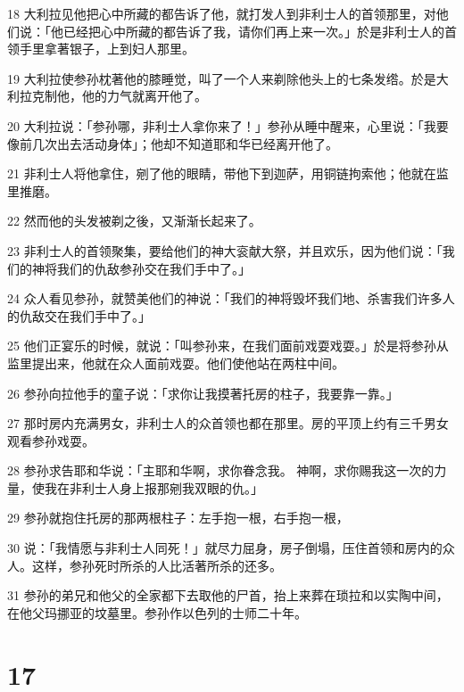 \par 18 大利拉见他把心中所藏的都告诉了他，就打发人到非利士人的首领那里，对他们说：「他已经把心中所藏的都告诉了我，请你们再上来一次。」於是非利士人的首领手里拿著银子，上到妇人那里。
\par 19 大利拉使参孙枕著他的膝睡觉，叫了一个人来剃除他头上的七条发绺。於是大利拉克制他，他的力气就离开他了。
\par 20 大利拉说：「参孙哪，非利士人拿你来了！」参孙从睡中醒来，心里说：「我要像前几次出去活动身体」；他却不知道耶和华已经离开他了。
\par 21 非利士人将他拿住，剜了他的眼睛，带他下到迦萨，用铜链拘索他；他就在监里推磨。
\par 22 然而他的头发被剃之後，又渐渐长起来了。
\par 23 非利士人的首领聚集，要给他们的神大衮献大祭，并且欢乐，因为他们说：「我们的神将我们的仇敌参孙交在我们手中了。」
\par 24 众人看见参孙，就赞美他们的神说：「我们的神将毁坏我们地、杀害我们许多人的仇敌交在我们手中了。」
\par 25 他们正宴乐的时候，就说：「叫参孙来，在我们面前戏耍戏耍。」於是将参孙从监里提出来，他就在众人面前戏耍。他们使他站在两柱中间。
\par 26 参孙向拉他手的童子说：「求你让我摸著托房的柱子，我要靠一靠。」
\par 27 那时房内充满男女，非利士人的众首领也都在那里。房的平顶上约有三千男女观看参孙戏耍。
\par 28 参孙求告耶和华说：「主耶和华啊，求你眷念我。 神啊，求你赐我这一次的力量，使我在非利士人身上报那剜我双眼的仇。」
\par 29 参孙就抱住托房的那两根柱子：左手抱一根，右手抱一根，
\par 30 说：「我情愿与非利士人同死！」就尽力屈身，房子倒塌，压住首领和房内的众人。这样，参孙死时所杀的人比活著所杀的还多。
\par 31 参孙的弟兄和他父的全家都下去取他的尸首，抬上来葬在琐拉和以实陶中间，在他父玛挪亚的坟墓里。参孙作以色列的士师二十年。

\chapter{17}

